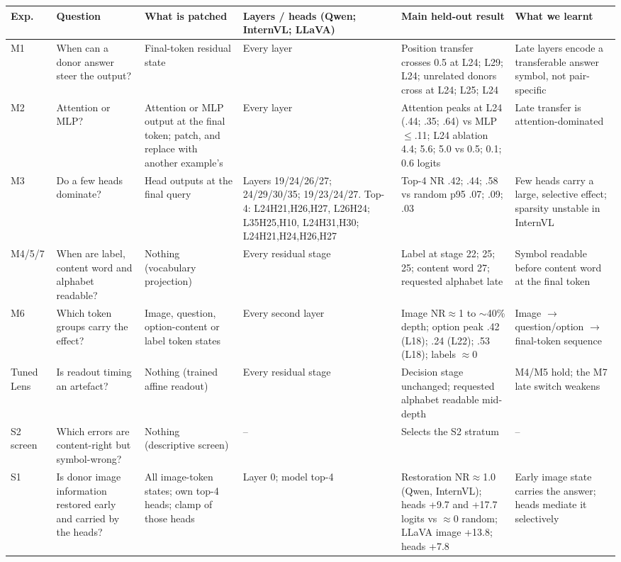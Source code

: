 \documentclass[11pt]{article}
\newcommand{\nr}{\mathrm{NR}}
\begin{document}
\begin{table}[t]
\centering
\scriptsize
\setlength{\tabcolsep}{2.5pt}
\begin{tabularx}{\textwidth}{@{}l>{\raggedright\arraybackslash}p{}>{\raggedright\arraybackslash}p{}>{\raggedright\arraybackslash}p{}>{\raggedright\arraybackslash}X>{\raggedright\arraybackslash}p{}@{}}
\toprule
Exp. & Question & What is patched & Layers / heads (Qwen; InternVL; LLaVA) & Main held-out result & What we learnt \\
\midrule
M1 & When can a donor answer steer the output? & Final-token residual state & Every layer & Position transfer crosses 0.5 at L24; L29; L24; unrelated donors cross at L24; L25; L24 & Late layers encode a transferable answer symbol, not pair-specific \\
M2 & Attention or MLP? & Attention or MLP output at the final token; patch, and replace with another example's & Every layer & Attention peaks at L24 (.44; .35; .64) vs MLP $\le$.11; L24 ablation 4.4; 5.6; 5.0 vs 0.5; 0.1; 0.6 logits & Late transfer is attention-dominated \\
M3 & Do a few heads dominate? & Head outputs at the final query & Layers 19/24/26/27; 24/29/30/35; 19/23/24/27. Top-4: L24H21,H26,H27, L26H24; L35H25,H10, L24H31,H30; L24H21,H24,H26,H27 & Top-4 $\nr$ .42; .44; .58 vs random p95 .07; .09; .03 & Few heads carry a large, selective effect; sparsity unstable in InternVL \\
M4/5/7 & When are label, content word and alphabet readable? & Nothing (vocabulary projection) & Every residual stage & Label at stage 22; 25; 25; content word 27; requested alphabet late & Symbol readable before content word at the final token \\
M6 & Which token groups carry the effect? & Image, question, option-content or label token states & Every second layer & Image $\nr\approx$1 to $\sim$40\% depth; option peak .42 (L18); .24 (L22); .53 (L18); labels $\approx$0 & Image $\to$ question/option $\to$ final-token sequence \\
Tuned Lens & Is readout timing an artefact? & Nothing (trained affine readout) & Every residual stage & Decision stage unchanged; requested alphabet readable mid-depth & M4/M5 hold; the M7 late switch weakens \\
S2 screen & Which errors are content-right but symbol-wrong? & Nothing (descriptive screen) & -- & Selects the S2 stratum & -- \\
S1 & Is donor image information restored early and carried by the heads? & All image-token states; own top-4 heads; clamp of those heads & Layer 0; model top-4 & Restoration $\nr\approx$1.0 (Qwen, InternVL); heads +9.7 and +17.7 logits vs $\approx$0 random; LLaVA image +13.8; heads +7.8 & Early image state carries the answer; heads mediate it selectively \\

\end{tabularx}
\end{table}
\end{document}
